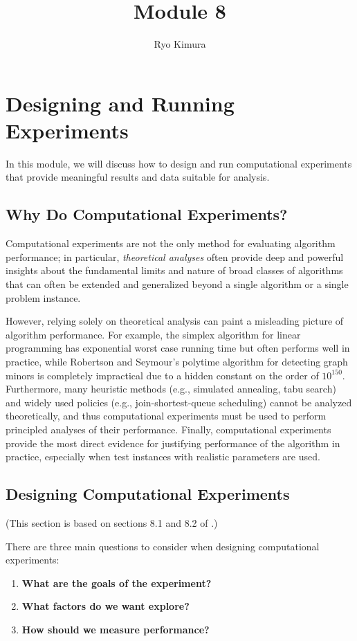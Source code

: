\documentclass[12pt]{article}
\begin{document}
\title{Module 8}
\author{Ryo Kimura}
\date{}
\maketitle

\setcounter{section}{7}
\section{Designing and Running Experiments}
In this module, we will discuss how to design and run computational experiments that provide meaningful results and data suitable for analysis.

\subsection{Why Do Computational Experiments?}
Computational experiments are not the only method for evaluating algorithm performance; in particular, \emph{theoretical analyses} often provide deep and powerful insights about the fundamental limits and nature of broad classes of algorithms that can often be extended and generalized beyond a single algorithm or a single problem instance.

However, relying solely on theoretical analysis can paint a misleading picture of algorithm performance. For example, the simplex algorithm for linear programming has exponential worst case running time \cite{klee1970good} but often performs well in practice, while Robertson and Seymour's polytime algorithm for detecting graph minors \cite{robertson1995graph,robertson2004graph} is completely impractical due to a hidden constant on the order of $10^{150}$. Furthermore, many heuristic methods (e.g., simulated annealing, tabu search) and widely used policies (e.g., join-shortest-queue scheduling) cannot be analyzed theoretically, and thus computational experiments must be used to perform principled analyses of their performance. Finally, computational experiments provide the most direct evidence for justifying performance of the algorithm in practice, especially when test instances with realistic parameters are used.

\subsection{Designing Computational Experiments}
(This section is based on sections 8.1 and 8.2 of \cite{muller2010algeng}.)

There are three main questions to consider when designing computational experiments: 
\begin{enumerate}
    \item \textbf{What are the goals of the experiment?}
    \item \textbf{What factors do we want explore?}
    \item \textbf{How should we measure performance?}
\end{enumerate}
\end{document}
